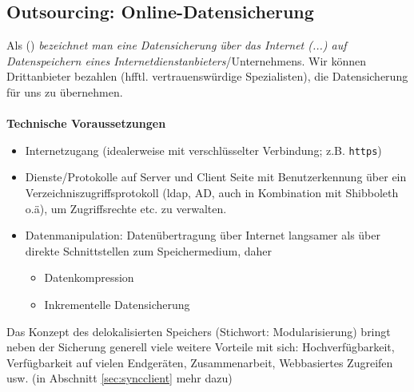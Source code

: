\subsection{Outsourcing: Online-Datensicherung}
Als  () \textit{bezeichnet man eine Datensicherung über das Internet (...) auf Datenspeichern eines Internetdienstanbieters}/Unternehmens. Wir können Drittanbieter bezahlen (hfftl. vertrauenswürdige Spezialisten), die Datensicherung für uns zu übernehmen.~\\~\\
\textbf{Technische Voraussetzungen}
\begin{itemize}
	\item Internetzugang (idealerweise mit verschlüsselter Verbindung; z.B. \texttt{https})
	\item Dienste/Protokolle auf Server und Client Seite mit Benutzerkennung über ein Verzeichniszugriffsprotokoll (ldap, AD, auch in Kombination mit Shibboleth o.ä), um Zugriffsrechte etc. zu verwalten.
	\item Datenmanipulation: Datenübertragung über Internet langsamer als über direkte Schnittstellen zum Speichermedium, daher
	\begin{itemize}
		\item Datenkompression
		\item Inkrementelle Datensicherung
	\end{itemize}
\end{itemize}
%
Das Konzept des delokalisierten Speichers (Stichwort: Modularisierung) bringt neben der Sicherung generell viele weitere Vorteile mit sich: Hochverfügbarkeit, Verfügbarkeit auf vielen Endgeräten, Zusammenarbeit, Webbasiertes Zugreifen usw. (in Abschnitt \ref{sec:syncclient} mehr dazu)






